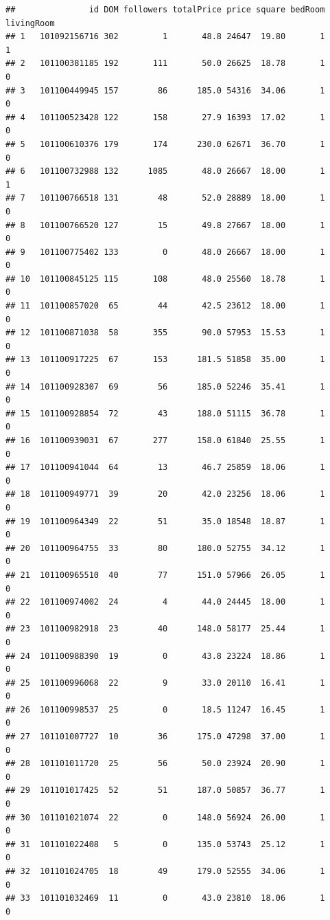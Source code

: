 \documentclass[
]{article}
\begin{document}
\begin{verbatim}
##               id DOM followers totalPrice price square bedRoom livingRoom
## 1   101092156716 302         1       48.8 24647  19.80       1          1
## 2   101100381185 192       111       50.0 26625  18.78       1          0
## 3   101100449945 157        86      185.0 54316  34.06       1          0
## 4   101100523428 122       158       27.9 16393  17.02       1          0
## 5   101100610376 179       174      230.0 62671  36.70       1          0
## 6   101100732988 132      1085       48.0 26667  18.00       1          1
## 7   101100766518 131        48       52.0 28889  18.00       1          0
## 8   101100766520 127        15       49.8 27667  18.00       1          0
## 9   101100775402 133         0       48.0 26667  18.00       1          0
## 10  101100845125 115       108       48.0 25560  18.78       1          0
## 11  101100857020  65        44       42.5 23612  18.00       1          0
## 12  101100871038  58       355       90.0 57953  15.53       1          0
## 13  101100917225  67       153      181.5 51858  35.00       1          0
## 14  101100928307  69        56      185.0 52246  35.41       1          0
## 15  101100928854  72        43      188.0 51115  36.78       1          0
## 16  101100939031  67       277      158.0 61840  25.55       1          0
## 17  101100941044  64        13       46.7 25859  18.06       1          0
## 18  101100949771  39        20       42.0 23256  18.06       1          0
## 19  101100964349  22        51       35.0 18548  18.87       1          0
## 20  101100964755  33        80      180.0 52755  34.12       1          0
## 21  101100965510  40        77      151.0 57966  26.05       1          0
## 22  101100974002  24         4       44.0 24445  18.00       1          0
## 23  101100982918  23        40      148.0 58177  25.44       1          0
## 24  101100988390  19         0       43.8 23224  18.86       1          0
## 25  101100996068  22         9       33.0 20110  16.41       1          0
## 26  101100998537  25         0       18.5 11247  16.45       1          0
## 27  101101007727  10        36      175.0 47298  37.00       1          0
## 28  101101011720  25        56       50.0 23924  20.90       1          0
## 29  101101017425  52        51      187.0 50857  36.77       1          0
## 30  101101021074  22         0      148.0 56924  26.00       1          0
## 31  101101022408   5         0      135.0 53743  25.12       1          0
## 32  101101024705  18        49      179.0 52555  34.06       1          0
## 33  101101032469  11         0       43.0 23810  18.06       1          0

\end{verbatim}
\end{document}
